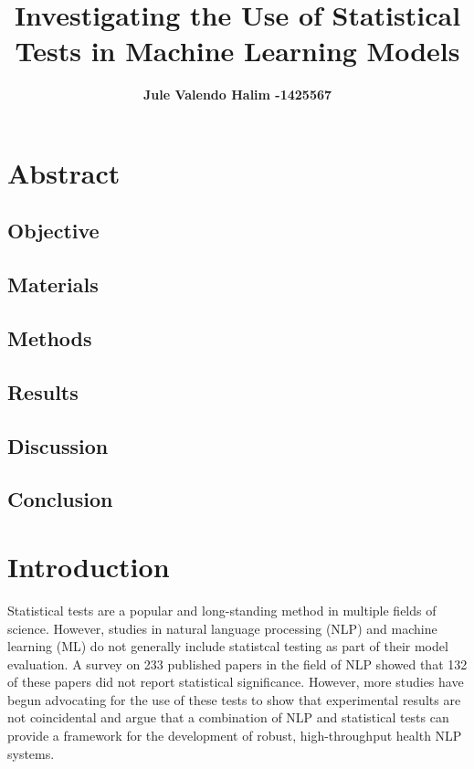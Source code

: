 \documentclass[10.7pt, onecolumn]{article}
\title{\vspace{-2em} Investigating the Use of Statistical Tests in Machine Learning Models}
\author[ ]{\bf\fontsize{13}{14}\selectfont Jule Valendo Halim -1425567\vspace{-.7em}}
\affil[ ]{\bf\fontsize{13}{14}\selectfont University of Melbourne}
\date{} %
\begin{document}
\maketitle
\vspace{-4em} %

\section{Abstract}\label{abstract}
\subsection{Objective}

\subsection{Materials}

\subsection{Methods}

\subsection{Results}

\subsection{Discussion}

\subsection{Conclusion}

\section{Introduction}\label{introduction}
Statistical tests are a popular and long-standing method in multiple fields of science. However, studies in natural language processing (NLP) and machine learning (ML) do not generally include statistcal testing as part of their model evaluation. A survey on 233 published papers in the field of NLP showed that 132 of these papers did not report statistical significance\cite{statsPaper}. However, more studies have begun advocating for the use of these tests to show that experimental results are not coincidental\cite{statsPaper} and argue that a combination of NLP and statistical tests can provide a framework for the development of robust, high-throughput health NLP systems\cite{10.1197/jamia.M3028}. 
\end{document}
